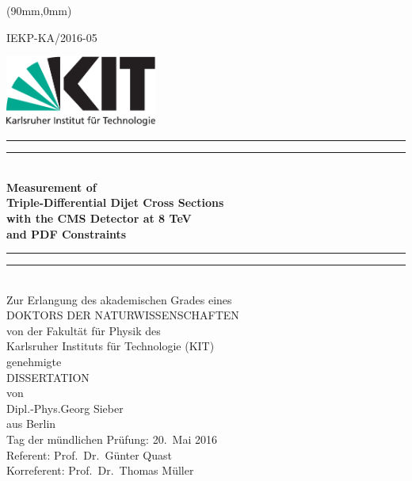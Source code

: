 \begin{titlepage}
    \begin{center}
        \begin{textblock*}{5cm}(90mm,0mm)
            \begin{flushright}
                \small
                IEKP-KA/2016-05
            \end{flushright}
        \end{textblock*}
        \includegraphics[width=5.0cm]{figures/Kitlogo_de_cmyk}
        \vspace*{2cm}

        \vspace*{\baselineskip}
        \rule{\textwidth}{1.6pt}\vspace*{-\baselineskip}\vspace*{2pt}
        \rule{\textwidth}{0.4pt}\\[\baselineskip]
        \LARGE{\textbf{Measurement of\\
            Triple-Differential Dijet Cross Sections\\
            with the CMS Detector at 8 TeV\\
        and PDF Constraints}}\\
        \rule{\textwidth}{0.4pt}\vspace*{-\baselineskip}\vspace{3.2pt}
        \rule{\textwidth}{1.6pt}\\[\baselineskip]
        \vspace{6ex}
        \large Zur Erlangung des akademischen Grades eines\\[2.5ex]
        \textsc{DOKTORS DER NATURWISSENSCHAFTEN}\\[2.5ex]
            von der Fakult\"at f\"ur Physik des\\
        Karlsruher Instituts f\"ur Technologie (KIT)\\ 
        genehmigte\\
        \vspace{2.5ex}
        \textsc{DISSERTATION}\\
        \vspace{2.5ex}
        von\\
        \vspace{2ex}
        Dipl.-Phys.\;Georg Sieber\\
        aus Berlin\\

\vspace{\fill}
Tag der mündlichen Prüfung: 20.\ Mai 2016\\[1.5ex]
Referent: Prof.\ Dr.\ Günter Quast\\[0.5ex]
Korreferent: Prof.\ Dr.\ Thomas Müller
    \end{center}
\end{titlepage}
\cleardoublepage
